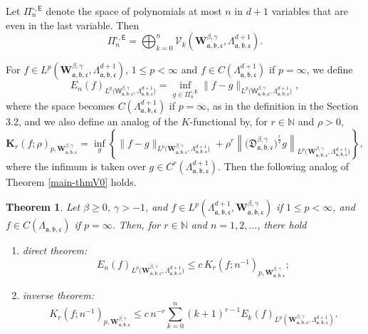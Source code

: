 \documentclass{amsart}
\newtheorem{thm}{Theorem}[section]
\theoremstyle{remark}
\def\sE{{\mathsf E}}
\def\sW{{\mathsf W}}
\def\fa{{\mathfrak a}}
\def\fb{{\mathfrak b}}
\def\fc{{\mathfrak c}}
\def\fD{{\mathfrak D}}
\def\b{{\beta}}
\def\g{{\gamma}}
\def\Kb{{\mathbf K}}
\def\Wb{{\mathbf W}}
\def\CV{{\mathcal V}}
\def\NN{{\mathbb N}}
\def\proj{\operatorname{proj}}
\def\f{\frac}
\begin{document}
Let $\Pi_n^{\circ, \sE}$ denote the space of polynomials at most $n$ in $d+1$ variables that are even in 
the last variable. Then 
$$
   \Pi_n^{\circ,\sE} = \bigoplus_{k=0}^n \CV_k\left(\Wb_{\fa, \fb, \fc}^{\b,\g},\Lambda_{\fa, \fb, \fc}^{d+1}\right). 
$$

For $f \in L^p(\Wb_{\fa, \fb, \fc}^{\b,\g},\Lambda_{\fa, \fb, \fc}^{d+1})$, $1 \le p < \infty$ and 
$f \in C(\Lambda_{\fa, \fb,\fc}^{d+1})$ if $p = \infty$, we define  
$$
   E_n(f)_{L^p\big(\sW_{\fa, \fb, \fc}^{\b,\g},\Lambda_{\fa, \fb, \fc}^{d+1}\big)}
       = \inf_{g \in\Pi_n^{\circ,\sE}} \|f - g\|_{L^p\big(\sW_{\fa, \fb, \fc}^{\b,\g},\Lambda_{\fa, \fb, \fc}^{d+1}\big)},
$$
where the space becomes $C(\Lambda_{\fa,\fb,\fc}^{d+1})$ if $p = \infty$, as in the definition in the Section 3.2, 
and we also define an analog of the $K$-functional by, for $r \in \NN$ and $\rho > 0$,  
$$
\Kb_r(f; \rho)_{p,\Wb_{\fa,\fb,\fc}^{\b,\g}} = 
  \inf_{g} \left\{ \|f - g\|_{L^p\big(\Wb_{\fa, \fb, \fc}^{\b,\g},\Lambda_{\fa, \fb, \fc}^{d+1}\big)} + 
  \rho^r \left \|\big (\fD_{\fa,\fb,\fc}^{\b,\g}\big )^\f r 2 g \right\|_{L^p\big(\Wb_{\fa, \fb, \fc}^{\b,\g},\Lambda_{\fa, \fb, \fc}^{d+1}\big)} \right \}, 
$$
where the infimum is taken over $g \in C^r(\Lambda_{\fa,\fb,\fc}^{d+1})$. Then the following analog of 
Theorem \ref{main-thmV0} holds. 

\begin{thm} \label{thm:approx-d}
Let $\b \ge 0$, $\g> -1$, and $f \in L^p(\Lambda_{\fa,\fb,\fc}^{d+1},\Wb_{\fa,\fb,\fc}^{\b,\g})$ if $1 \le p < \infty$, 
and $f \in C(\Lambda_{\fa,\fb,\fc})$ if $p = \infty$. Then, for $r \in \NN$ and $n =1,2,\ldots$, there hold 
\begin{enumerate} [\rm (i)]
\item {\it direct theorem}:
$$
    E_n(f)_{L^p\big(\Wb_{\fa, \fb, \fc}^{\b,\g},\Lambda_{\fa, \fb, \fc}^{d+1}\big)} 
        \le c \, K_r(f;  n^{-1})_{p, \Wb_{\fa, \fb, \fc}^{\b,\g}} ;
$$
\item {\it inverse theorem}:  
$$
   K_r(f; n^{-1})_{p, \Wb_{\fa, \fb, \fc}^{\b,\g}} 
         \le c \,n^{-r} \sum_{k=0}^n (k+1)^{r-1} E_k(f)_{L^p(\Wb_{\fa, \fb, \fc}^{\b,\g},\Lambda_{\fa, \fb, \fc}^{d+1})}.
$$
\end{enumerate}
\end{thm}
\end{document}
